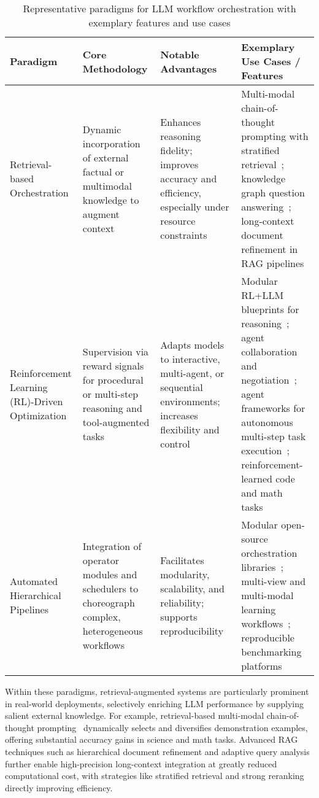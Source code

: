 \documentclass[sigconf]{acmart}
\begin{document}
\begin{table*}[htbp]
\centering
\caption{Representative paradigms for LLM workflow orchestration with exemplary features and use cases}
\label{tab:workflow_paradigms}
\begin{adjustbox}{max width=\textwidth}
\begin{tabular}{@{}llll@{}}
\toprule
\textbf{Paradigm} & \textbf{Core Methodology} & \textbf{Notable Advantages} & \textbf{Exemplary Use Cases / Features} \\
\midrule
Retrieval-based Orchestration & Dynamic incorporation of external factual or multimodal knowledge to augment context & Enhances reasoning fidelity; improves accuracy and efficiency, especially under resource constraints~\cite{ref5,ref50,ref79,ref80} & Multi-modal chain-of-thought prompting with stratified retrieval~\cite{ref5}; knowledge graph question answering~\cite{ref50}; long-context document refinement in RAG pipelines~\cite{ref80} \\
Reinforcement Learning (RL)-Driven Optimization & Supervision via reward signals for procedural or multi-step reasoning and tool-augmented tasks & Adapts models to interactive, multi-agent, or sequential environments; increases flexibility and control~\cite{ref8,ref9,ref12,ref37,ref55,ref60,ref64,ref86} & Modular RL+LLM blueprints for reasoning~\cite{ref12}; agent collaboration and negotiation~\cite{ref60}; agent frameworks for autonomous multi-step task execution~\cite{ref55}; reinforcement-learned code and math tasks~\cite{ref57} \\
Automated Hierarchical Pipelines & Integration of operator modules and schedulers to choreograph complex, heterogeneous workflows & Facilitates modularity, scalability, and reliability; supports reproducibility~\cite{ref12,ref64,ref86,ref79} & Modular open-source orchestration libraries~\cite{ref12,ref64}; multi-view and multi-modal learning workflows~\cite{ref79}; reproducible benchmarking platforms~\cite{ref64} \\
\bottomrule
\end{tabular}
\end{adjustbox}
\end{table*}

Within these paradigms, retrieval-augmented systems are particularly prominent in real-world deployments, selectively enriching LLM performance by supplying salient external knowledge. For example, retrieval-based multi-modal chain-of-thought prompting~\cite{ref5} dynamically selects and diversifies demonstration examples, offering substantial accuracy gains in science and math tasks. Advanced RAG techniques such as hierarchical document refinement and adaptive query analysis~\cite{ref80} further enable high-precision long-context integration at greatly reduced computational cost, with strategies like stratified retrieval and strong reranking directly improving efficiency.
\end{document}
